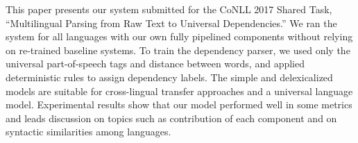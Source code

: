 This paper presents our system submitted for the CoNLL 2017 Shared Task, ``Multilingual Parsing from Raw Text to Universal Dependencies.'' We ran the system for all languages with our own fully pipelined components without relying on re-trained baseline systems. To train the dependency parser, we used only the universal part-of-speech tags and distance between words, and applied deterministic rules to assign dependency labels.  The simple and delexicalized models are suitable for cross-lingual transfer approaches and a universal language model.  Experimental results show that our model performed well in some metrics and leads discussion on topics such as contribution of each component and on syntactic similarities among languages.
